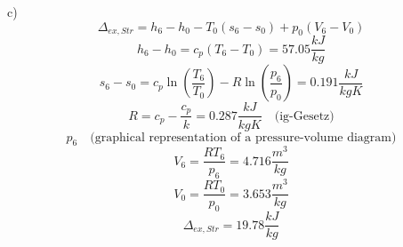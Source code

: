 c)
\[
\Delta_{ex,Str} = h_6 - h_0 - T_0 (s_6 - s_0) + p_0 (V_6 - V_0)
\]
\[
h_6 - h_0 = c_p (T_6 - T_0) = 57.05 \frac{kJ}{kg}
\]
\[
s_6 - s_0 = c_p \ln \left( \frac{T_6}{T_0} \right) - R \ln \left( \frac{p_6}{p_0} \right) = 0.191 \frac{kJ}{kgK}
\]
\[
R = c_p - \frac{c_p}{k} = 0.287 \frac{kJ}{kgK} \quad \text{(ig-Gesetz)}
\]
\[
p_6 \quad \text{(graphical representation of a pressure-volume diagram)}
\]
\[
V_6 = \frac{RT_6}{p_6} = 4.716 \frac{m^3}{kg}
\]
\[
V_0 = \frac{RT_0}{p_0} = 3.653 \frac{m^3}{kg}
\]
\[
\Delta_{ex,Str} = 19.78 \frac{kJ}{kg}
\]